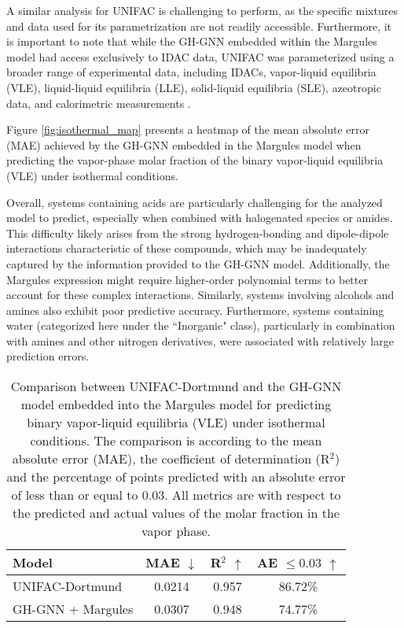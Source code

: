 A similar analysis for UNIFAC is challenging to perform, as the specific mixtures and data used for its parametrization are not readily accessible. Furthermore, it is important to note that while the GH-GNN embedded within the Margules model had access exclusively to IDAC data, UNIFAC was parameterized using a broader range of experimental data, including IDACs, vapor-liquid equilibria (VLE), liquid-liquid equilibria (LLE), solid-liquid equilibria (SLE), azeotropic data, and calorimetric measurements \cite{gmehling2002modified}.

Figure \ref{fig:isothermal_map} presents a heatmap of the mean absolute error (MAE) achieved by the GH-GNN embedded in the Margules model when predicting the vapor-phase molar fraction of the binary vapor-liquid equilibria (VLE) under isothermal conditions. 

Overall, systems containing acids are particularly challenging for the analyzed model to predict, especially when combined with halogenated species or amides. This difficulty likely arises from the strong hydrogen-bonding and dipole-dipole interactions characteristic of these compounds, which may be inadequately captured by the information provided to the GH-GNN model. Additionally, the Margules expression might require higher-order polynomial terms to better account for these complex interactions. Similarly, systems involving alcohols and amines also exhibit poor predictive accuracy. Furthermore, systems containing water (categorized here under the ``Inorganic" class), particularly in combination with amines and other nitrogen derivatives, were associated with relatively large prediction errors.


\begin{table}[h]
\centering
  \caption{Comparison between UNIFAC-Dortmund and the GH-GNN model embedded into the Margules model for predicting binary vapor-liquid equilibria (VLE) under isothermal conditions. The comparison is according to the mean absolute error (MAE), the coefficient of determination (R$^2$) and the percentage of points predicted with an absolute error of less than or equal to 0.03. All metrics are with respect to the predicted and actual values of the molar fraction in the vapor phase.}
  \label{tbl:isothermal}
  \small
  \begin{tabular*}{1\textwidth}{@{\extracolsep{\fill}}lccc}
    \hline
    \textbf{Model} & \textbf{MAE} $\downarrow$ & \textbf{R$^2$} $\uparrow$ & \textbf{AE $\leq 0.03$} $\uparrow$ \\
    \hline
    UNIFAC-Dortmund & 0.0214 & 0.957 & 86.72\% \\
    GH-GNN + Margules & 0.0307 & 0.948 & 74.77\% \\
    \hline
  \end{tabular*}
\end{table}


